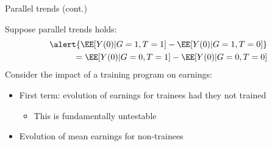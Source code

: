 \documentclass[compress, 8pt]{beamer}
\begin{document}
\begin{frame}{Parallel trends (cont.)}

Suppose parallel trends holds:
\begin{align*}
    \alert{\EE [{Y(0)} \vert G = 1, T = 1] - \EE [{Y(0)} \vert G = 1, T = 0]} \\
    = \EE [{Y(0)} \vert G = 0, T = 1] - \EE [{Y(0)} \vert G = 0, T = 0]
\end{align*}
Consider the impact of a training program on earnings:
\begin{itemize}
    \item \alert{First term:} evolution of earnings for trainees had they not trained 
    \begin{itemize}
        \item This is fundamentally untestable
    \end{itemize}

    \item Evolution of mean earnings for non-trainees


\end{itemize}


\end{frame}











\end{document}
